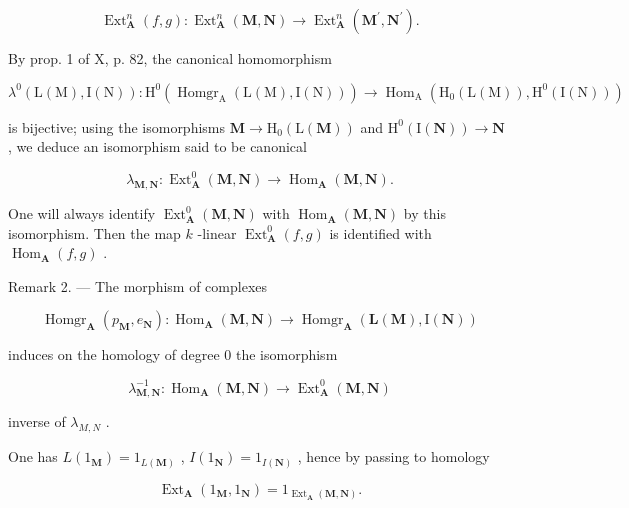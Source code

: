 \[
\operatorname{Ext} _ {\mathbf {A}} ^ {n} (f, g): \operatorname{Ext} _ {\mathbf {A}} ^ {n} (\mathbf {M}, \mathbf {N}) \rightarrow \operatorname{Ext} _ {\mathbf {A}} ^ {n} \left(\mathbf {M} ^ {\prime}, \mathbf {N} ^ {\prime}\right).
\]

By prop. 1 of X, p. 82, the canonical homomorphism

\[
\lambda^ {0} (\mathrm{L} (\mathrm{M}), \mathrm{I} (\mathrm{N})): \mathrm{H} ^ {0} \left(\operatorname{Homgr} _ {\mathrm{A}} (\mathrm{L} (\mathrm{M}), \mathrm{I} (\mathrm{N}))\right)\rightarrow \operatorname{Hom} _ {\mathrm{A}} \left(\mathrm{H} _ {0} (\mathrm{L} (\mathrm{M})), \mathrm{H} ^ {0} (\mathrm{I} (\mathrm{N}))\right)
\]

is bijective; using the isomorphisms \(\mathbf{M} \to \mathrm{H}_{0}(\mathrm{L}(\mathbf{M}))\) and \(\mathrm{H}^{0}(\mathrm{I}(\mathbf{N})) \to \mathbf{N}\) , we deduce an isomorphism said to be canonical

\[
\lambda_ {\mathbf {M}, \mathbf {N}}: \operatorname{Ext} _ {\mathbf {A}} ^ {0} (\mathbf {M}, \mathbf {N}) \rightarrow \operatorname{Hom} _ {\mathbf {A}} (\mathbf {M}, \mathbf {N}).\tag{7}
\]

One will always identify \(\operatorname{Ext}_{\mathbf{A}}^{0}(\mathbf{M},\mathbf{N})\) with \(\operatorname{Hom}_{\mathbf{A}}(\mathbf{M},\mathbf{N})\) by this isomorphism. Then the map \(k\) -linear \(\operatorname{Ext}_{\mathbf{A}}^{0}(f,g)\) is identified with \(\operatorname{Hom}_{\mathbf{A}}(f,g)\) .

Remark 2. --- The morphism of complexes

\[
\operatorname{Homgr} _ {\mathbf {A}} \left(p _ {\mathbf {M}}, e _ {\mathbf {N}}\right): \operatorname{Hom} _ {\mathbf {A}} (\mathbf {M}, \mathbf {N}) \rightarrow \operatorname{Homgr} _ {\mathbf {A}} \left(\mathbf {L} (\mathbf {M}), \mathrm{I} (\mathbf {N})\right)
\]

induces on the homology of degree 0 the isomorphism

\[
\lambda_ {\mathbf {M}, \mathbf {N}} ^ {- 1}: \operatorname{Hom} _ {\mathbf {A}} (\mathbf {M}, \mathbf {N}) \rightarrow \operatorname{Ext} _ {\mathbf {A}} ^ {0} (\mathbf {M}, \mathbf {N})
\]

inverse of \(\lambda_{M,N}\) .

One has \(L(1_{\mathbf{M}}) = 1_{L(\mathbf{M})}\) , \(I(1_{\mathbf{N}}) = 1_{I(\mathbf{N})}\) , hence by passing to homology

\[
\operatorname{Ext} _ {\mathbf {A}} \left(1 _ {\mathbf {M}}, 1 _ {\mathbf {N}}\right) = 1 _ {\operatorname{Ext} _ {\mathbf {A}} (\mathbf {M}, \mathbf {N})}.\tag{8}
\]

